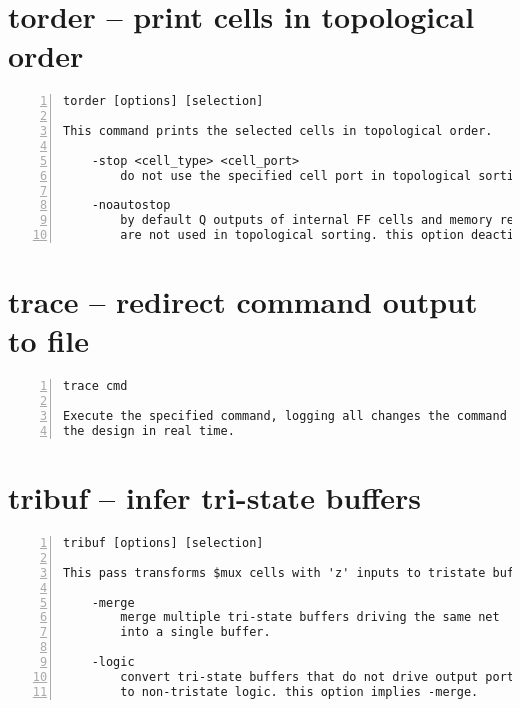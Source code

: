 \section{torder -- print cells in topological order}
\label{cmd:torder}
\begin{lstlisting}[numbers=left,frame=single]
    torder [options] [selection]

This command prints the selected cells in topological order.

    -stop <cell_type> <cell_port>
        do not use the specified cell port in topological sorting

    -noautostop
        by default Q outputs of internal FF cells and memory read port outputs
        are not used in topological sorting. this option deactivates that.
\end{lstlisting}

\section{trace -- redirect command output to file}
\label{cmd:trace}
\begin{lstlisting}[numbers=left,frame=single]
    trace cmd

Execute the specified command, logging all changes the command performs on
the design in real time.
\end{lstlisting}

\section{tribuf -- infer tri-state buffers}
\label{cmd:tribuf}
\begin{lstlisting}[numbers=left,frame=single]
    tribuf [options] [selection]

This pass transforms $mux cells with 'z' inputs to tristate buffers.

    -merge
        merge multiple tri-state buffers driving the same net
        into a single buffer.

    -logic
        convert tri-state buffers that do not drive output ports
        to non-tristate logic. this option implies -merge.
\end{lstlisting}

